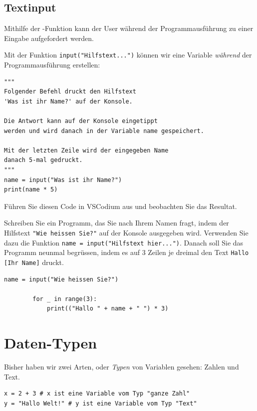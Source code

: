 \subsection{Textinput}
Mithilfe der -Funktion kann der User während der Programmausführung zu einer Eingabe aufgefordert werden.
\begin{myexample}\label{ex:input}
Mit der Funktion \lstinline|input("Hilfstext...")| können wir eine Variable \textit{während} der Programmausführung erstellen:

\begin{lstlisting}
""" 
Folgender Befehl druckt den Hilfstext 
'Was ist ihr Name?' auf der Konsole. 

Die Antwort kann auf der Konsole eingetippt 
werden und wird danach in der Variable name gespeichert. 

Mit der letzten Zeile wird der eingegeben Name 
danach 5-mal gedruckt.
"""
name = input("Was ist ihr Name?") 
print(name * 5)
\end{lstlisting}

Führen Sie diesen Code in VSCodium aus und beobachten Sie das Resultat.
\end{myexample}

\begin{mysubmission}\label{ex:name}
	Schreiben Sie ein Programm, das Sie nach Ihrem Namen fragt, indem der Hilfstext \lstinline|"Wie heissen Sie?"| auf der Konsole ausgegeben wird. Verwenden Sie dazu die Funktion \lstinline|name = input("Hilfstext hier...")|. Danach soll Sie das Programm neunmal begrüssen, indem es auf 3 Zeilen je dreimal den Text \texttt{Hallo [Ihr Name]} druckt.
	\begin{myanswer}
		\begin{lstlisting}[numbers=none]
		name = input("Wie heissen Sie?")
		
		for _ in range(3):
		    print(("Hallo " + name + " ") * 3)
	  \end{lstlisting}
	\end{myanswer}
\end{mysubmission}


\section{Daten-Typen}
Bisher haben wir zwei Arten, oder \textit{Typen} von Variablen gesehen: Zahlen und Text.

\begin{lstlisting}
x = 2 + 3 # x ist eine Variable vom Typ "ganze Zahl"
y = "Hallo Welt!" # y ist eine Variable vom Typ "Text"
\end{lstlisting}


